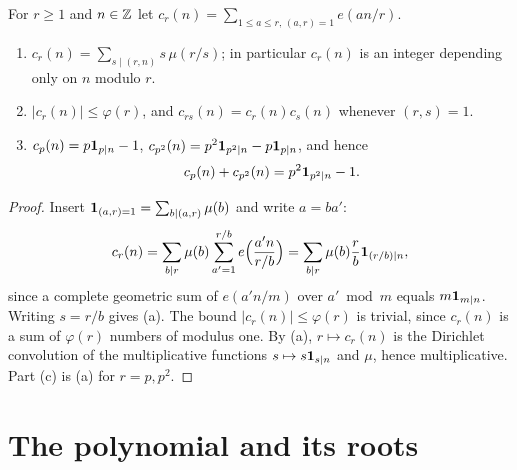 For $r\ge1$ and $n\in\mathbb Z$ let $c_r(n)=\sum_{1\le a\le r,\,(a,r)=1}e(an/r)$.

\begin{lemma}\label{lem:ramanujan}
\begin{enumerate}[label=(\alph*)]
\item $c_r(n)=\sum_{s\mid(r,n)}s\,\mu(r/s)$; in particular $c_r(n)$ is an integer depending only on $n$ modulo $r$.
\item $|c_r(n)|\le\varphi(r)$, and $c_{rs}(n)=c_r(n)c_s(n)$ whenever $(r,s)=1$.
\item $c_p(n)=p\mathbf 1_{p\mid n}-1$, $c_{p^2}(n)=p^2\mathbf 1_{p^2\mid n}-p\mathbf 1_{p\mid n}$, and hence
\begin{equation}\label{eq:cp-sum}
c_p(n)+c_{p^2}(n)=p^2\mathbf 1_{p^2\mid n}-1.
\end{equation}
\end{enumerate}
\end{lemma}

\begin{proof}
Insert $\mathbf 1_{(a,r)=1}=\sum_{b\mid(a,r)}\mu(b)$ and write $a=ba'$:
\[
c_r(n)=\sum_{b\mid r}\mu(b)\sum_{a'=1}^{r/b}e\Bigl(\frac{a'n}{r/b}\Bigr)=\sum_{b\mid r}\mu(b)\frac rb\mathbf 1_{(r/b)\mid n},
\]
since a complete geometric sum of $e(a'n/m)$ over $a'\bmod m$ equals $m\mathbf 1_{m\mid n}$. Writing $s=r/b$ gives (a). The bound $|c_r(n)|\le\varphi(r)$ is trivial, since $c_r(n)$ is a sum of $\varphi(r)$ numbers of modulus one. By (a), $r\mapsto c_r(n)$ is the Dirichlet convolution of the multiplicative functions $s\mapsto s\mathbf 1_{s\mid n}$ and $\mu$, hence multiplicative. Part (c) is (a) for $r=p,p^2$.
\end{proof}

\section{The polynomial and its roots}

